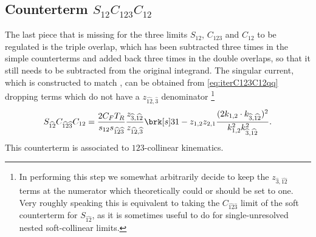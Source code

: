 \documentclass[11pt,a4paper]{article}
\newcommand{\mpd}[1]{\widehat{#1}}
\begin{document}
\begin{comment}
A potential drawback of this choice is that
it makes the subtraction of disjoint collinear limits more complicated.
In fact, within the formula
\begin{equation}
	1
	- C_{12} - C_{34}
	+ C_{\mpd{3}\mpd{4}} C_{12} + C_{\mpd{1}\mpd{2}} C_{34}
	- C_{12;34},
\end{equation}
the last three terms, which all feature the same kinematics
thanks to the commutativity property of the rescaling mapping,
now differ \emph{only} because of jacobian factors.	
\end{comment}


\subsection{Counterterm $S_{12}C_{123}C_{12}$}

The last piece that is missing for the three limits
$S_{12}$, $C_{123}$ and $C_{12}$ to be regulated is the triple overlap,
which has been subtracted three times in the simple counterterms
and added back three times in the double overlaps,
so that it still needs to be subtracted from the original integrand.
The singular current, which is constructed to match \cite{Somogyi:2006da},
can be obtained from \cref{eq:iterC123C12qq} dropping terms
which do not have a $z_{\mpd{12},\mpd{3}}$ denominator%
\footnote{
In performing this step we somewhat arbitrarily decide
to keep the $z_{\mpd{3},\mpd{12}}$ terms at the numerator
which theoretically could or should be set to one.
Very roughly speaking this is equivalent to taking
the $C_{\mpd{12}\mpd{3}}$ limit of the soft counterterm for $S_{\mpd{12}}$,
as it is sometimes useful to do for single-unresolved
nested soft-collinear limits.
}
\begin{equation}
	S_{\mpd{12}} C_{\mpd{12}\mpd{3}} C_{12}
	= \frac{2 C_F T_R}{s_{12}s_{\mpd{12}\mpd{3}}}
	\frac{z_{\mpd{3},\mpd{12}}}{z_{\mpd{12},\mpd{3}}}
	\brk[s]3{
		1 - z_{1,2} z_{2,1}
		\frac{(2k_{1,2}\cdot k_{\mpd{3},\mpd{12}})^2}
		{k_{1,2}^2 k_{\mpd{3},\mpd{12}}^2}
	}.
\end{equation}
This counterterm is associated to $123$-collinear kinematics.
\end{document}
